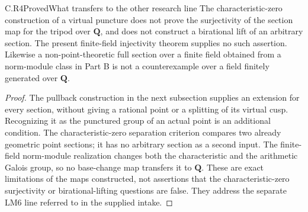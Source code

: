 \begin{claim}{C.R4}{Proved}{What transfers to the other research line}
The characteristic-zero construction of a virtual puncture
does not prove the surjectivity of the section map for the
tripod over $\mathbf Q$, and does not construct a birational
lift of an arbitrary section. The present finite-field
injectivity theorem supplies no such assertion. Likewise a
non-point-theoretic full section over a finite field obtained
from a norm-module class in Part B is not a counterexample
over a field finitely generated over $\mathbf Q$.
\end{claim}
\begin{proof}
The pullback construction in the next subsection supplies an
extension for every section, without giving a rational point or
a splitting of its virtual cusp. Recognizing it as the punctured
group of an actual point is an additional condition. The
characteristic-zero separation criterion compares two already
geometric point sections; it has no arbitrary section as a
second input. The finite-field norm-module realization changes
both the characteristic and the arithmetic Galois group, so no
base-change map transfers it to $\mathbf Q$. These are exact
limitations of the maps constructed, not assertions that the
characteristic-zero surjectivity or birational-lifting questions
are false. They address the separate LM6 line referred to in
the supplied intake.
\end{proof}


